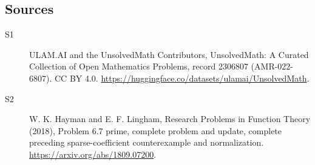\documentclass[11pt]{article}
\begin{document}
\subsection{Sources}
\begin{description}
\item[\hypertarget{source:2306807:1}{S1}] ULAM.AI and the UnsolvedMath Contributors, UnsolvedMath: A Curated Collection of Open Mathematics Problems, record 2306807 (AMR-022-6807). CC BY 4.0. \url{https://huggingface.co/datasets/ulamai/UnsolvedMath}.
\item[\hypertarget{source:2306807:2}{S2}] W. K. Hayman and E. F. Lingham, Research Problems in Function Theory (2018), Problem 6.7 prime, complete problem and update, complete preceding sparse-coefficient counterexample and normalization. \url{https://arxiv.org/abs/1809.07200}.
\end{description}
\label{end:2306807}
\end{document}
